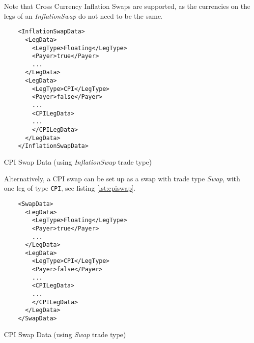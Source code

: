 Note that Cross Currency Inflation Swaps are supported, as the currencies on the legs of an  \emph{InflationSwap} do not need to be the same. 


\begin{listing}[H]
\begin{verbatim}
    <InflationSwapData>
      <LegData>
        <LegType>Floating</LegType>
        <Payer>true</Payer>
        ...
      </LegData>
      <LegData>
        <LegType>CPI</LegType>
        <Payer>false</Payer>
        ...
        <CPILegData>
        ...
        </CPILegData>
      </LegData>
    </InflationSwapData>
\end{verbatim}
\caption{CPI Swap Data (using \emph{InflationSwap} trade type)}
\label{lst:cpiinflationswap}
\end{listing}


Alternatively, a CPI swap can be set up as a swap with trade type \emph{Swap}, with one leg of type {\tt CPI}, see listing \ref{lst:cpiswap}.

\begin{listing}[H]
\begin{verbatim}
    <SwapData>
      <LegData>
        <LegType>Floating</LegType>
        <Payer>true</Payer>
        ...
      </LegData>
      <LegData>
        <LegType>CPI</LegType>
        <Payer>false</Payer>
        ...
        <CPILegData>
        ...
        </CPILegData>
      </LegData>
    </SwapData>
\end{verbatim}
\caption{CPI Swap Data (using \emph{Swap} trade type)}
\label{lst:cpiswap}
\end{listing}

